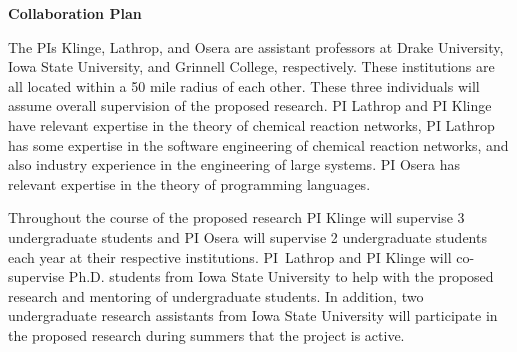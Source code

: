 \documentclass[11pt]{article}
\begin{document}
    \setcounter{page}{1}
    \begin{center}
        {\Large {\bf Collaboration Plan}}
    \end{center}

      The PIs Klinge, Lathrop, and Osera are assistant professors at Drake University, Iowa State University, and Grinnell College, respectively.
      These institutions are all located within a 50 mile radius of each other.
      These three individuals will assume overall supervision of the proposed research.
      PI Lathrop and PI Klinge have relevant expertise in the theory of chemical reaction networks, PI Lathrop has some expertise in the software engineering of chemical reaction networks, and also industry experience in the engineering of large systems.
      PI Osera has relevant expertise in the theory of programming languages.
    
      Throughout the course of the proposed research PI Klinge will supervise 3 undergraduate students and PI Osera will supervise 2 undergraduate students each year at their respective institutions.
      PI~Lathrop and PI Klinge will co-supervise Ph.D. students from Iowa State University to help with the proposed research and mentoring of undergraduate students.
      In addition, two undergraduate research assistants from Iowa State University will participate in the proposed research during summers that the project is active.
      
\end{document}
